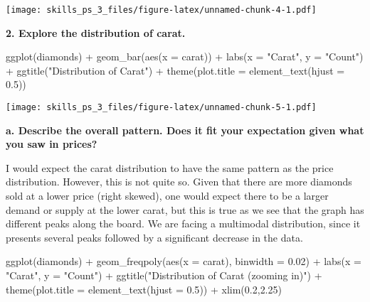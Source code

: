 \documentclass[
]{article}
\newenvironment{Shaded}{\begin{snugshade}}{\end{snugshade}}
\newcommand{\AttributeTok}[1]{\textcolor[rgb]{0.77,0.63,0.00}{#1}}
\newcommand{\FloatTok}[1]{\textcolor[rgb]{0.00,0.00,0.81}{#1}}
\newcommand{\FunctionTok}[1]{\textcolor[rgb]{0.00,0.00,0.00}{#1}}
\newcommand{\NormalTok}[1]{#1}
\newcommand{\SpecialCharTok}[1]{\textcolor[rgb]{0.00,0.00,0.00}{#1}}
\newcommand{\StringTok}[1]{\textcolor[rgb]{0.31,0.60,0.02}{#1}}
\begin{document}
\texttt{[image: skills\_ps\_3\_files/figure-latex/unnamed-chunk-4-1.pdf]}

\textbf{2. Explore the distribution of carat.}

\begin{Shaded}
\begin{Highlighting}[]
\FunctionTok{ggplot}\NormalTok{(diamonds) }\SpecialCharTok{+} 
  \FunctionTok{geom\_bar}\NormalTok{(}\FunctionTok{aes}\NormalTok{(}\AttributeTok{x =}\NormalTok{ carat)) }\SpecialCharTok{+}
  \FunctionTok{labs}\NormalTok{(}\AttributeTok{x =} \StringTok{"Carat"}\NormalTok{, }\AttributeTok{y =} \StringTok{"Count"}\NormalTok{) }\SpecialCharTok{+}
  \FunctionTok{ggtitle}\NormalTok{(}\StringTok{"Distribution of Carat"}\NormalTok{) }\SpecialCharTok{+}
  \FunctionTok{theme}\NormalTok{(}\AttributeTok{plot.title =} \FunctionTok{element\_text}\NormalTok{(}\AttributeTok{hjust =} \FloatTok{0.5}\NormalTok{))}
\end{Highlighting}
\end{Shaded}

\texttt{[image: skills\_ps\_3\_files/figure-latex/unnamed-chunk-5-1.pdf]}

\textbf{a. Describe the overall pattern. Does it fit your expectation
given what you saw in prices?}

I would expect the carat distribution to have the same pattern as the
price distribution. However, this is not quite so. Given that there are
more diamonds sold at a lower price (right skewed), one would expect
there to be a larger demand or supply at the lower carat, but this is
true as we see that the graph has different peaks along the board. We
are facing a multimodal distribution, since it presents several peaks
followed by a significant decrease in the data.

\begin{Shaded}
\begin{Highlighting}[]
\FunctionTok{ggplot}\NormalTok{(diamonds) }\SpecialCharTok{+} 
  \FunctionTok{geom\_freqpoly}\NormalTok{(}\FunctionTok{aes}\NormalTok{(}\AttributeTok{x =}\NormalTok{ carat), }\AttributeTok{binwidth =} \FloatTok{0.02}\NormalTok{) }\SpecialCharTok{+}
  \FunctionTok{labs}\NormalTok{(}\AttributeTok{x =} \StringTok{"Carat"}\NormalTok{, }\AttributeTok{y =} \StringTok{"Count"}\NormalTok{) }\SpecialCharTok{+}
  \FunctionTok{ggtitle}\NormalTok{(}\StringTok{"Distribution of Carat (zooming in)"}\NormalTok{) }\SpecialCharTok{+}
  \FunctionTok{theme}\NormalTok{(}\AttributeTok{plot.title =} \FunctionTok{element\_text}\NormalTok{(}\AttributeTok{hjust =} \FloatTok{0.5}\NormalTok{)) }\SpecialCharTok{+}
  \FunctionTok{xlim}\NormalTok{(}\FloatTok{0.2}\NormalTok{,}\FloatTok{2.25}\NormalTok{)}
\end{Highlighting}
\end{Shaded}
\end{document}
